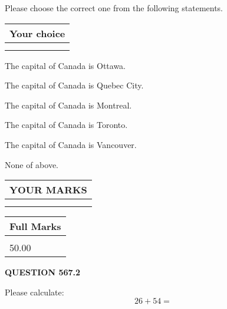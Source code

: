 \documentclass[12pt]{article}
\begin{document}
  
Please choose the correct one from the following statements.
  
  
\noindent\hspace{3.0in} \begin{tabular}{|l|}
\hline
Your choice \\
\hline
 \\ 
 \\ 
\hline
\end{tabular}
  
  
 
 
The capital of Canada is Ottawa.
 
 
The capital of Canada is Quebec City.
 
 
The capital of Canada is Montreal.
 
 
The capital of Canada is Toronto.
 
 
The capital of Canada is Vancouver.
 
 
 None of above.
 
 
  
\vspace{0.2in}
  
\noindent\begin{tabular}{|l|}
\hline
 YOUR MARKS  \\
\hline
 \\ 
 \\ 
\hline
\end{tabular}
\hspace{0.05in} \begin{tabular}{|l|}
\hline
 Full Marks  \\
\hline
 \\ 
50.00 \\
\hline
\end{tabular}
{\textbf{\Large{QUESTION
567.2 
}}}
  
  
 
Please calculate:
\begin{equation}
26 +  %
54 = \nonumber
\end{equation}
 

 

 
   
   
 \vspace{0.2in}
 
   
   
   
   
\end{document}
